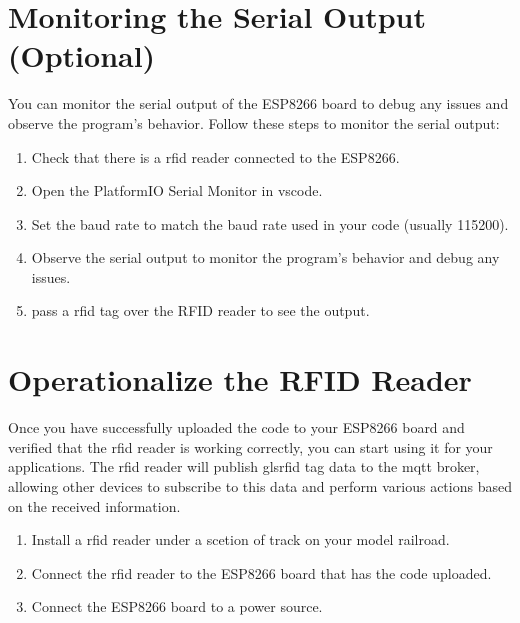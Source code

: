 \section{Monitoring the Serial Output (Optional)}
You can monitor the serial output of the ESP8266 board to debug any issues and observe the program's behavior. Follow these steps to monitor the serial output:
\begin{enumerate}
    \item Check that there is a \gls{rfid} reader connected to the ESP8266.
    \item Open the PlatformIO Serial Monitor in \gls{vscode}.
    \item Set the baud rate to match the baud rate used in your code (usually 115200).
    \item Observe the serial output to monitor the program's behavior and debug any issues.
    \item pass a \gls{rfid} tag over the RFID reader to see the output.
\end{enumerate}

\section{Operationalize the RFID Reader}
Once you have successfully uploaded the code to your ESP8266 board and verified that the \gls{rfid} reader is working correctly, you can start using it for your applications.
The \gls{rfid} reader will publish gls{rfid} tag data to the \gls{mqtt} broker, allowing other devices to subscribe to this data and perform various actions based on the received information.
\begin{enumerate}
    \item Install a \gls{rfid} reader under a scetion of track on your model railroad.
    \item Connect the \gls{rfid} reader to the ESP8266 board that has the code uploaded.
    \item Connect the ESP8266 board to a power source.
\end{enumerate}

